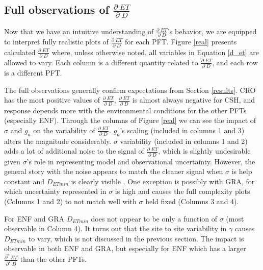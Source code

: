 \documentclass[draft,linenumbers]{agujournal}
\begin{document}
\subsection{Full observations of $\frac{\partial \; ET}{\partial \; D}$}

Now that we have an intuitive understanding of $\frac{\partial \; ET}{\partial \; D}$'s behavior, we are equipped to interpret fully realistic plots of $\frac{\partial \; ET}{\partial \; D}$ for each PFT. Figure \ref{real} presents calculated $\frac{\partial \; ET}{\partial \; D}$ where, unless otherwise noted, all variables in Equation \ref{d_et} are allowed to vary. Each column is a different quantity related to $\frac{\partial \; ET}{\partial \; D}$, and each row is a different PFT.

The full observations generally confirm expectations from Section \ref{results}. CRO has the most positive values of $\frac{\partial \; ET}{\partial \; D}$, $\frac{\partial \; ET}{\partial \; D}$ is almost always negative for CSH, and response depends more with the environmental conditions for the other PFTs (especially ENF). Through the columns of Figure \ref{real} we can see the impact of $\sigma$ and $g_a$ on the variability of $\frac{\partial \; ET}{\partial \; D}$. $g_a$'s scaling (included in columns 1 and 3) alters the magnitude considerably. $\sigma$ variability (included in columns 1 and 2) adds a lot of additional noise to the signal of $\frac{\partial \; ET}{\partial \; D}$, which is slightly undesirable given $\sigma$'s role in representing model and observational uncertainty. However, the general story with the noise appears to match the cleaner signal when $\sigma$ is help constant and $D_{ETmin}$ is clearly visible . One exception is possibly with GRA, for which uncertainty represented in $\sigma$ is high and causes the full complexity plots (Columns 1 and 2) to not match well with $\sigma$ held fixed (Columns 3 and 4).

For ENF and GRA $D_{ETmin}$ does not appear to be only a function of $\sigma$ (most observable in Column 4). It turns out that the site to site variability in $\gamma$ causes $D_{ETmin}$ to vary, which is not discussed in the previous section. The impact is observable in both ENF and GRA, but especially for ENF which has a larger $\frac{\partial^2 \; ET}{\partial^2 \; D}$ than the other PFTs. 
\end{document}
